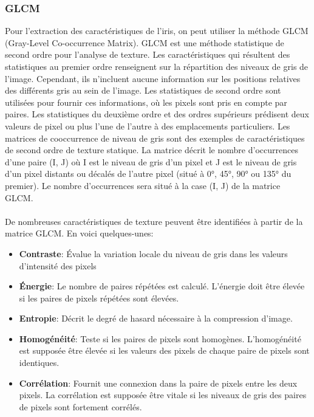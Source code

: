\documentclass[12pt,twoside,letterpaper]{article}
\begin{document}
\subsubsection{GLCM}
Pour l’extraction des caractéristiques de l’iris, on peut utiliser la méthode GLCM (Gray-Level Co-occurrence Matrix). GLCM est une méthode statistique de second ordre pour l'analyse de texture. Les caractéristiques qui résultent des statistiques au premier ordre renseignent sur la répartition des niveaux de gris de l'image. Cependant, ils n'incluent aucune information sur les positions relatives des différents gris au sein de l'image. Les statistiques de second ordre sont utilisées pour fournir ces informations, où les pixels sont pris en compte par paires. Les statistiques du deuxième ordre et des ordres supérieurs prédisent deux valeurs de pixel ou plus l'une de l'autre à des emplacements particuliers. Les matrices de cooccurrence de niveau de gris sont des exemples de caractéristiques de second ordre de texture statique. La matrice décrit le nombre d’occurrences d’une paire (I, J) où I est le niveau de gris d’un pixel et J est le niveau de gris d’un pixel distants ou décalés de l’autre pixel (situé à 0°, 45°, 90° ou 135° du premier). Le nombre d’occurrences sera situé à la case (I, J) de la matrice GLCM.
\\~\\
De nombreuses caractéristiques de texture peuvent être identifiées à partir de la matrice GLCM. En voici quelques-unes:
\begin{itemize}
    \item \textbf{Contraste}: Évalue la variation locale du niveau de gris dans les valeurs d'intensité des pixels
    \item \textbf{Énergie}: Le nombre de paires répétées est calculé. L'énergie doit être élevée si les paires de pixels répétées sont élevées.
    \item \textbf{Entropie}: Décrit le degré de hasard nécessaire à la compression d'image.
    \item \textbf{Homogénéité}: Teste si les paires de pixels sont homogènes. L'homogénéité est supposée être élevée si les valeurs des pixels de chaque paire de pixels sont identiques.
    \item \textbf{Corrélation}: Fournit une connexion dans la paire de pixels entre les deux pixels. La corrélation est supposée être vitale si les niveaux de gris des paires de pixels sont fortement corrélés.
\end{itemize}
\citep{ref_02}
\end{document}
